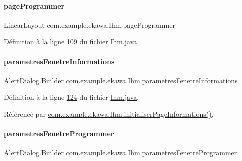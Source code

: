 \paragraph{\texorpdfstring{page\+Programmer}{pageProgrammer}}
{\footnotesize\ttfamily Linear\+Layout com.\+example.\+ekawa.\+Ihm.\+page\+Programmer\hspace{0.3cm}{\ttfamily [private]}}



Définition à la ligne \hyperlink{_ihm_8java_source_l00109}{109} du fichier \hyperlink{_ihm_8java_source}{Ihm.\+java}.

\mbox{\label{classcom_1_1example_1_1ekawa_1_1_ihm_a610b25d0bf8b26fbf1ed24345acef189}} 
\paragraph{\texorpdfstring{parametres\+Fenetre\+Informations}{parametresFenetreInformations}}
{\footnotesize\ttfamily Alert\+Dialog.\+Builder com.\+example.\+ekawa.\+Ihm.\+parametres\+Fenetre\+Informations\hspace{0.3cm}{\ttfamily [private]}}



Définition à la ligne \hyperlink{_ihm_8java_source_l00124}{124} du fichier \hyperlink{_ihm_8java_source}{Ihm.\+java}.



Référencé par \hyperlink{_ihm_8java_source_l00637}{com.\+example.\+ekawa.\+Ihm.\+initialiser\+Page\+Informations()}.

\mbox{\label{classcom_1_1example_1_1ekawa_1_1_ihm_a6eb2afb2fe8da7f3a749089c84934145}} 
\paragraph{\texorpdfstring{parametres\+Fenetre\+Programmer}{parametresFenetreProgrammer}}
{\footnotesize\ttfamily Alert\+Dialog.\+Builder com.\+example.\+ekawa.\+Ihm.\+parametres\+Fenetre\+Programmer\hspace{0.3cm}{\ttfamily [private]}}



